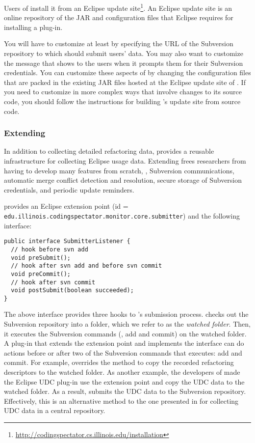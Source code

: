 Users of \CodingSpectator{} install it from an Eclipse update
site\footnote{\url{http://codingspectator.cs.illinois.edu/installation}}. An
Eclipse update site is an online repository of the JAR and configuration files
that Eclipse requires for installing a plug-in.

You will have to customize \CodingSpectator{} at least by specifying the URL of
the Subversion repository to which \CodingSpectator{} should submit users' data.
You may also want to customize the message that \CodingSpectator{} shows to the
users when it prompts them for their Subversion credentials. You can customize
these aspects of \CodingSpectator{} by changing the configuration files that are
packed in the existing JAR files hosted at the Eclipse update site of
\CodingSpectator. If you need to customize \CodingSpectator{} in more complex
ways that involve changes to its source code, you should follow the instructions
for building \CodingSpectator's update site from source code.

\subsubsection{Extending \CodingSpectator}

In addition to collecting detailed refactoring data, \CodingSpectator{} provides
a reusable infrastructure for collecting Eclipse usage data. Extending
\CodingSpectator{} frees researchers from having to develop many features from
scratch, \eg, Subversion communications, automatic merge conflict detection and
resolution, secure storage of Subversion credentials, and periodic update
reminders.

\CodingSpectator{} provides an Eclipse extension point (id =
\texttt{edu.\-illinois.\-codingspectator.\-monitor.\-core.\-submitter}) and the
following interface:

\begin{lstlisting}
public interface SubmitterListener {
  // hook before svn add
  void preSubmit();
  // hook after svn add and before svn commit
  void preCommit();
  // hook after svn commit
  void postSubmit(boolean succeeded);
}
\end{lstlisting}

The above interface provides three hooks to \CodingSpectator's submission
process. \CodingSpectator{} checks out the Subversion repository into a folder,
which we refer to as the \emph{watched folder}. Then, it executes the Subversion
commands (\eg, add and commit) on the watched folder. A plug-in that extends the
 extension point and implements the 
interface can do actions before or after two of the Subversion commands that
\CodingSpectator{} executes: add and commit.
%
For example, \CodingSpectator{} overrides the method  to copy
the recorded refactoring descriptors to the watched folder. As another example,
the developers of \CodingSpectator{} made the Eclipse UDC plug-in use the
 extension point and copy the UDC data to the watched folder. As
a result, \CodingSpectator{} submits the UDC data to the Subversion repository.
Effectively, this is an alternative method to the one presented in
 for collecting UDC data in a central repository.

